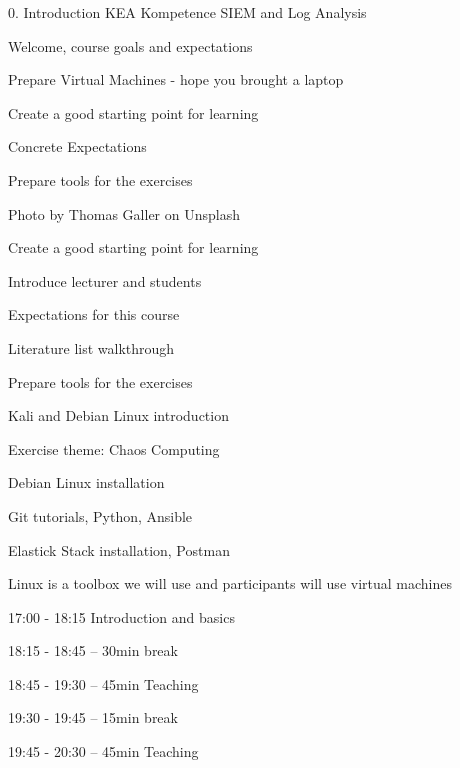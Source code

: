 \documentclass[Screen16to9,17pt]{foils}
\begin{document}
\mytitlepage
{0. Introduction}
{KEA Kompetence SIEM and Log Analysis}

\hlkprofiluk



\begin{list2}
\item Welcome, course goals and expectations
\item Prepare Virtual Machines - hope you brought a laptop
\item Create a good starting point for learning
\item Concrete Expectations
\item Prepare tools for the exercises
\end{list2}

Photo by Thomas Galler on Unsplash


\begin{list2}
\item Create a good starting point for learning
\item Introduce lecturer and students
\item Expectations for this course
\item Literature list walkthrough
\item Prepare tools for the exercises
\item Kali and Debian Linux introduction
\end{list2}

Exercise theme: Chaos Computing
\begin{list2}
\item Debian Linux installation
\item Git tutorials, Python, Ansible
\item Elastick Stack installation, Postman
\end{list2}
Linux is a toolbox we will use and participants will use virtual machines



\begin{list1}
\item 17:00 - 18:15
Introduction and basics
\item 18:15 - 18:45 -- 30min break
\item 18:45 - 19:30 -- 45min Teaching
\item 19:30 - 19:45 -- 15min break
\item 19:45 - 20:30 -- 45min Teaching
\end{list1}
\end{document}
